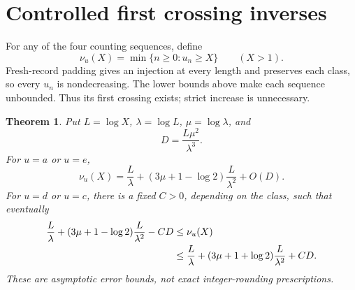 \documentclass[11pt,letterpaper]{article}
\newtheorem{theorem}{Theorem}[section]\newtheorem{lemma}[theorem]{Lemma}\newtheorem{proposition}[theorem]{Proposition}\newtheorem{corollary}[theorem]{Corollary}
\theoremstyle{remark}\newtheorem{remark}[theorem]{Remark}
\theoremstyle{remark}\newtheorem{wremark}{Remark}\renewcommand{\thewremark}{W\arabic{wremark}}
\theoremstyle{plain}\newtheorem{wcorollary}[wremark]{Corollary}
\begin{document}
\section{Controlled first crossing inverses}\label{a59:sec:inverse}
For any of the four counting sequences, define
\[
 \nu_u(X)=\min\{n\ge0:u_n\ge X\}\qquad(X>1).
\]
Fresh-record padding gives an injection at every length and preserves each class, so every $u_n$ is nondecreasing. The lower bounds above make each sequence unbounded. Thus its first crossing exists; strict increase is unnecessary.

\begin{theorem}\label{a59:thm:inverse}
Put $L=\log X$, $\lambda=\log L$, $\mu=\log\lambda$, and
\[
 D=\frac{L\mu^2}{\lambda^3}.
\]
For $u=a$ or $u=e$,
\begin{equation}\label{a59:eq:inverseexact}
 \nu_u(X)=\frac L\lambda
       +(3\mu+1-\log2)\frac L{\lambda^2}+O(D).
\end{equation}
For $u=d$ or $u=c$, there is a fixed $C>0$, depending on the class, such that eventually
\begin{align}
 \frac L\lambda+(3\mu+1-\log2)\frac L{\lambda^2}-CD
 &\le\nu_u(X)\notag\\
 &\le\frac L\lambda+(3\mu+1+\log2)\frac L{\lambda^2}+CD.
 \label{a59:eq:inversebracket}
\end{align}
These are asymptotic error bounds, not exact integer-rounding prescriptions.
\end{theorem}
\end{document}
